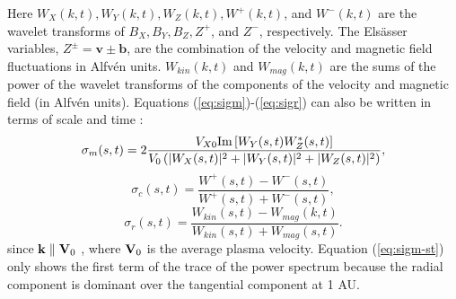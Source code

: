 \noindent Here $W_X(k,t),W_Y(k,t),W_Z(k,t),W^+(k,t)$, and $W^-(k,t)$ are the wavelet transforms of $B_X,B_Y,B_Z,Z^+$, and $Z^-$, respectively. The Els\"asser variables, $Z^\pm = \mathbf{v} \pm \mathbf{b}$, are the combination of the velocity and magnetic field fluctuations in Alfv\'en units. $W_{kin}(k,t)$ and $W_{mag}(k,t)$ are the sums of the power of the wavelet transforms of the components of the velocity and magnetic field (in Alfv\'en units). Equations (\ref{eq:sigm})-(\ref{eq:sigr}) can also be written in terms of scale and time : %
\begin{equation}
    \sigma_m(s,t) = 2\frac{ V_{X0}\textnormal{Im}\pp{W_Y(s,t)W_Z^*(s,t)}}{V_0 \p{|W_X(s,t)|^2 + |W_Y(s,t)|^2 + |W_Z(s,t)|^2}}, %
    \label{eq:sigm-st}
\end{equation}
\begin{equation}
    \sigma_c(s,t) = \frac{W^+(s,t)-W^-(s,t)}{W^+(s,t)+W^-(s,t)} ,
\end{equation}
 \begin{equation}
    \sigma_r(s,t) = \frac{W_{kin}(s,t) - W_{mag}(k,t)}{W_{kin}(s,t) + W_{mag}(s,t)} .
\end{equation}
since $\mathbf{k} \parallel \mathbf{V}_0$ \citep{Zhao:2021, Horbury:2008, Taylor:1938}, where $\mathbf{V}_0$ is the average plasma velocity. Equation (\ref{eq:sigm-st}) only shows the first term of the trace of the power spectrum because the radial component is dominant over the tangential component at 1 AU.



